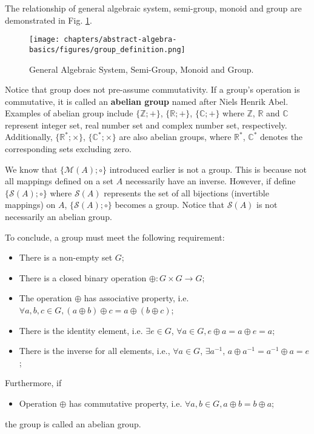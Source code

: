 The relationship of general algebraic system, semi-group, monoid and group are demonstrated in Fig. \ref{fig:group_definition}.
\begin{figure}[htbp]
	\centering
	\texttt{[image: chapters/abstract-algebra-basics/figures/group\_definition.png]}
	\caption{General Algebraic System, Semi-Group, Monoid and Group.} \label{fig:group_definition}
\end{figure}

Notice that group does not pre-assume commutativity. If a group's operation is commutative, it is called an \textbf{abelian group} named after Niels Henrik Abel. Examples of abelian group include $\{\mathbb{Z}; +\}$, $\{\mathbb{R}; +\}$, $\{\mathbb{C}; +\}$ where $\mathbb{Z}$, $\mathbb{R}$ and $\mathbb{C}$ represent integer set, real number set and complex number set, respectively. Additionally, $\{\mathbb{R}^{*}; \times \}$, $\{\mathbb{C}^{*}; \times \}$ are also abelian groups, where $\mathbb{R}^*$,  $\mathbb{C}^*$ denotes the corresponding sets excluding zero.

We know that $\{\mathcal{M}(A); \circ\}$ introduced earlier is not a group. This is because not all mappings defined on a set $A$ necessarily have an inverse. However, if define $\{\mathcal{S}(A); \circ\}$ where $\mathcal{S}(A)$ represents the set of all  bijections (invertible mappings) on $A$, $\{\mathcal{S}(A); \circ\}$ becomes a group. Notice that $\mathcal{S}(A)$ is not necessarily an abelian group.

To conclude, a group must meet the following requirement:
\begin{itemize}
	\item There is a non-empty set $G$;
	\item There is a closed binary operation $\oplus: G\times G \rightarrow G$;
	\item The operation $\oplus$ has associative property, i.e. $\forall a, b, c \in G, (a \oplus b) \oplus c = a\oplus (b \oplus c)$;
	\item There is the identity element, i.e. $\exists e\in G$, $\forall a \in G, e\oplus a = a \oplus e = a$;
	\item There is the inverse for all elements, i.e., $\forall a\in G$, $\exists a^{-1}$, $a\oplus a^{-1} = a^{-1}\oplus a = e$;
\end{itemize}
Furthermore, if
\begin{itemize}
	\item Operation $\oplus$ has commutative property, i.e. $\forall a, b\in G, a\oplus b=b\oplus a$;
\end{itemize}
the group is called an abelian group.


